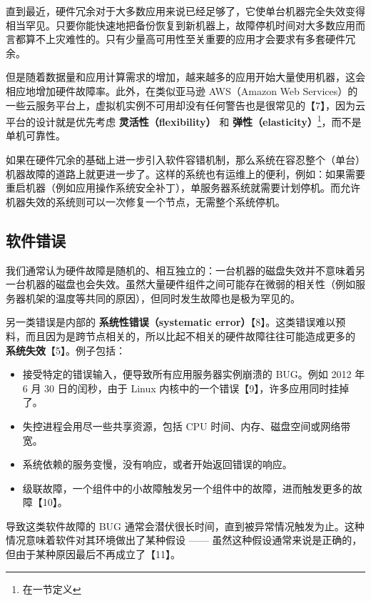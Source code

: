 直到最近，硬件冗余对于大多数应用来说已经足够了，它使单台机器完全失效变得相当罕见。只要你能快速地把备份恢复到新机器上，故障停机时间对大多数应用而言都算不上灾难性的。只有少量高可用性至关重要的应用才会要求有多套硬件冗余。

但是随着数据量和应用计算需求的增加，越来越多的应用开始大量使用机器，这会相应地增加硬件故障率。此外，在类似亚马逊 AWS（Amazon Web Services）的一些云服务平台上，虚拟机实例不可用却没有任何警告也是很常见的【7】，因为云平台的设计就是优先考虑 \textbf{灵活性（flexibility）} 和 \textbf{弹性（elasticity）}\footnote{在一节定义}，而不是单机可靠性。

如果在硬件冗余的基础上进一步引入软件容错机制，那么系统在容忍整个（单台）机器故障的道路上就更进一步了。这样的系统也有运维上的便利，例如：如果需要重启机器（例如应用操作系统安全补丁），单服务器系统就需要计划停机。而允许机器失效的系统则可以一次修复一个节点，无需整个系统停机。

\subsection{软件错误}

我们通常认为硬件故障是随机的、相互独立的：一台机器的磁盘失效并不意味着另一台机器的磁盘也会失效。虽然大量硬件组件之间可能存在微弱的相关性（例如服务器机架的温度等共同的原因），但同时发生故障也是极为罕见的。

另一类错误是内部的 \textbf{系统性错误（systematic error）}【8】。这类错误难以预料，而且因为是跨节点相关的，所以比起不相关的硬件故障往往可能造成更多的 \textbf{系统失效}【5】。例子包括：

\begin{itemize}

  \item 接受特定的错误输入，便导致所有应用服务器实例崩溃的 BUG。例如 2012 年 6 月 30 日的闰秒，由于 Linux 内核中的一个错误【9】，许多应用同时挂掉了。

  \item 失控进程会用尽一些共享资源，包括 CPU 时间、内存、磁盘空间或网络带宽。

  \item 系统依赖的服务变慢，没有响应，或者开始返回错误的响应。

  \item 级联故障，一个组件中的小故障触发另一个组件中的故障，进而触发更多的故障【10】。

\end{itemize}

导致这类软件故障的 BUG 通常会潜伏很长时间，直到被异常情况触发为止。这种情况意味着软件对其环境做出了某种假设 —— 虽然这种假设通常来说是正确的，但由于某种原因最后不再成立了【11】。

